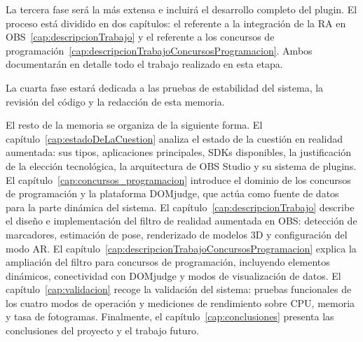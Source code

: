 La tercera fase será la más extensa e incluirá el desarrollo completo del plugin. El proceso está dividido en dos capítulos: el referente a la integración de la RA en OBS~\ref{cap:descripcionTrabajo} y el referente a los concursos de programación~\ref{cap:descripcionTrabajoConcursosProgramacion}. Ambos documentarán en detalle todo el trabajo realizado en esta etapa.

La cuarta fase estará dedicada a las pruebas de estabilidad del sistema, la revisión del código y la redacción de esta memoria.

El resto de la memoria se organiza de la siguiente forma. El capítulo~\ref{cap:estadoDeLaCuestion} analiza el estado de la cuestión en realidad aumentada: sus tipos, aplicaciones principales, SDKs disponibles, la justificación de la elección tecnológica, la arquitectura de OBS Studio y su sistema de plugins. El capítulo~\ref{cap:concursos_programacion} introduce el dominio de los concursos de programación y la plataforma DOMjudge, que actúa como fuente de datos para la parte dinámica del sistema. El capítulo~\ref{cap:descripcionTrabajo} describe el diseño e implementación del filtro de realidad aumentada en OBS: detección de marcadores, estimación de pose, renderizado de modelos 3D y configuración del modo AR. El capítulo~\ref{cap:descripcionTrabajoConcursosProgramacion} explica la ampliación del filtro para concursos de programación, incluyendo elementos dinámicos, conectividad con DOMjudge y modos de visualización de datos. El capítulo~\ref{cap:validacion} recoge la validación del sistema: pruebas funcionales de los cuatro modos de operación y mediciones de rendimiento sobre CPU, memoria y tasa de fotogramas. Finalmente, el capítulo~\ref{cap:conclusiones} presenta las conclusiones del proyecto y el trabajo futuro.




